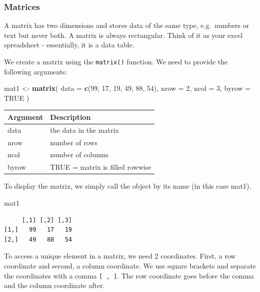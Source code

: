 \documentclass[]{article}
\newenvironment{Shaded}{\begin{snugshade}}{\end{snugshade}}
\newcommand{\DataTypeTok}[1]{\textcolor[rgb]{0.13,0.29,0.53}{#1}}
\newcommand{\DecValTok}[1]{\textcolor[rgb]{0.00,0.00,0.81}{#1}}
\newcommand{\KeywordTok}[1]{\textcolor[rgb]{0.13,0.29,0.53}{\textbf{#1}}}
\newcommand{\NormalTok}[1]{#1}
\newcommand{\OtherTok}[1]{\textcolor[rgb]{0.56,0.35,0.01}{#1}}
\newcommand{\StringTok}[1]{\textcolor[rgb]{0.31,0.60,0.02}{#1}}
\begin{document}
\hypertarget{matrices}{%
\subsubsection{Matrices}\label{matrices}}

A matrix has two dimensions and stores data of the same type, e.g.~numbers or text but never both. A matrix is always rectangular. Think of it as your excel spreadsheet - essentially, it is a data table.

We create a matrix using the \texttt{matrix()} function. We need to provide the following arguments:

\begin{Shaded}
\begin{Highlighting}[]
\NormalTok{mat1 <-}\StringTok{ }\KeywordTok{matrix}\NormalTok{(}
  \DataTypeTok{data =} \KeywordTok{c}\NormalTok{(}\DecValTok{99}\NormalTok{, }\DecValTok{17}\NormalTok{, }\DecValTok{19}\NormalTok{, }\DecValTok{49}\NormalTok{, }\DecValTok{88}\NormalTok{, }\DecValTok{54}\NormalTok{),}
  \DataTypeTok{nrow =} \DecValTok{2}\NormalTok{,}
  \DataTypeTok{ncol =} \DecValTok{3}\NormalTok{,}
  \DataTypeTok{byrow =} \OtherTok{TRUE}
\NormalTok{)}
\end{Highlighting}
\end{Shaded}

\begin{longtable}[]{@{}ll@{}}
\toprule
Argument & Description\tabularnewline
\midrule
\endhead
data & the data in the matrix\tabularnewline
nrow & number of rows\tabularnewline
ncol & number of columns\tabularnewline
byrow & TRUE = matrix is filled rowwise\tabularnewline
\bottomrule
\end{longtable}

To display the matrix, we simply call the object by its name (in this case mat1).

\begin{Shaded}
\begin{Highlighting}[]
\NormalTok{mat1}
\end{Highlighting}
\end{Shaded}

\begin{verbatim}
     [,1] [,2] [,3]
[1,]   99   17   19
[2,]   49   88   54
\end{verbatim}

To access a unique element in a matrix, we need 2 coordinates. First, a row coordinate and second, a column coordinate. We use square brackets and separate the coordinates with a comma \texttt{{[}\ ,\ {]}}. The row coordinate goes before the comma and the column coordinate after.
\end{document}
